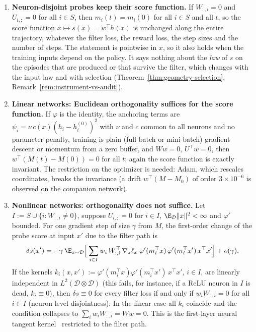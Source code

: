 \begin{theorem}\label{thm:geometry-training}
\leavevmode
\begin{enumerate}
  \item \textbf{Neuron-disjoint probes keep their score function.} If $W_{:,i} = 0$ and $U_{i,:} = 0$ for all $i \in S$, then $m_i(t) = m_i(0)$ for all $i \in S$ and all $t$, so the score function $x \mapsto s(x) = w^\top h(x)$ is unchanged along the entire trajectory, whatever the filter loss, the reward loss, the step sizes and the number of steps. The statement is pointwise in $x$, so it also holds when the training inputs depend on the policy. It says nothing about the \emph{law} of $s$ on the episodes that are produced or that survive the filter, which changes with the input law and with selection (Theorem~\ref{thm:geometry-selection}, Remark~\ref{rem:instrument-vs-audit}).
  \item \textbf{Linear networks: Euclidean orthogonality suffices for the score function.} If $\varphi$ is the identity, the anchoring terms are $\psi_i = \nu\, c(x)(h_i - h_i^{(0)})^2$ with $\nu$ and $c$ common to all neurons and no parameter penalty, training is plain (full-batch or mini-batch) gradient descent or momentum from a zero buffer, and $W w = 0$, $U^\top w = 0$, then $w^\top (M(t) - M(0)) = 0$ for all $t$; again the score function is exactly invariant. The restriction on the optimizer is needed: Adam, which rescales coordinates, breaks the invariance (a drift $w^\top(M - M_0)$ of order $3 \times 10^{-6}$ is observed on the companion network).
  \item \textbf{Nonlinear networks: orthogonality does not suffice.} Let $I := S \cup \{i : W_{:,i} \neq 0\}$, suppose $U_{i,:} = 0$ for $i \in I$, $\E_{\mathcal{D}}\|x\|^2 < \infty$ and $\varphi'$ bounded. For one gradient step of size $\gamma$ from $M$, the first-order change of the probe score at input $x'$ due to the filter path is
  \begin{equation}\label{eq:ntk-drift}
    \delta s(x') = -\gamma\, \E_{x \sim \mathcal{D}}\Big[\sum_{i \in I} w_i\, W_{:,i}^\top\, \nabla_z \ell_x \; \varphi'(m_i^\top x)\, \varphi'(m_i^\top x')\, x^\top x'\Big] + o(\gamma).
  \end{equation}
  If the kernels $k_i(x, x') := \varphi'(m_i^\top x)\varphi'(m_i^\top x')\, x^\top x'$, $i \in I$, are linearly independent in $L^2(\mathcal{D} \otimes \mathcal{D})$ (this fails, for instance, if a ReLU neuron in $I$ is dead, $k_i \equiv 0$), then $\delta s \equiv 0$ for every filter loss if and only if $w_i W_{:,i} = 0$ for all $i \in I$ (neuron-level disjointness). In the linear case all $k_i$ coincide and the condition collapses to $\sum_i w_i W_{:,i} = W w = 0$. This is the first-layer neural tangent kernel~\cite{jacot2018} restricted to the filter path.

\end{enumerate}
\end{theorem}
